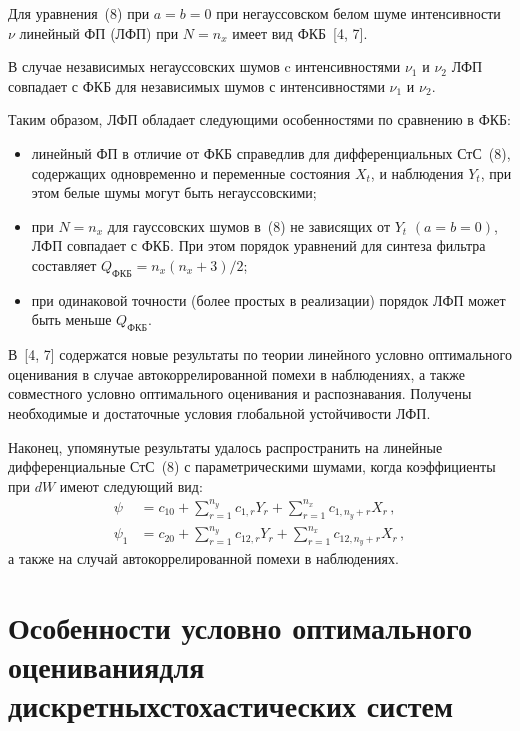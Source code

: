 \begin{multicols}{2}
Для уравнения~(8) при  $a=b=0$ при негауссовском белом шуме
 интенсивности  $\nu$ линейный ФП (ЛФП) при $N=n_x$
 имеет вид ФКБ~[4, 7].

В случае независимых негауссовских шумов c интенсивностями $\nu_1$
и $\nu_2$ ЛФП совпадает с ФКБ для
независимых шумов с интенсивностями $\nu_1$ и $\nu_2$.

Таким образом, ЛФП обладает следующими особенностями по
сравнению в ФКБ:
\begin{itemize}
\item линейный ФП в отличие от ФКБ справедлив для
дифференциальных СтС~(8), содержащих одновременно и переменные
состояния $X_t$, и наблюдения  $Y_t$, при этом белые шумы могут
быть негауссовскими;
\item
при  $N=n_x$ для гауссовских шумов в~(8) не
зависящих от  $Y_t$ $(a=b=0)$, ЛФП совпадает с ФКБ. При этом
порядок уравнений для синтеза фильтра составляет
$Q_{\mbox{ФКБ}} = n_x (n_x + 3)/2$;
\item
при одинаковой точности (более простых в
реализации) порядок ЛФП может быть меньше $Q_{\mbox{ФКБ}}$.
\end{itemize}

В~[4, 7] содержатся новые результаты по теории линейного условно
оптимального оценивания в случае автокоррелированной помехи в
наблюдениях, а также совместного условно оптимального оценивания и
распознавания. Получены необходимые и достаточные условия
глобальной устойчивости ЛФП.

Наконец, упомянутые результаты удалось распространить на линейные
дифференциальные СтС~(8) с параметрическими шумами, когда
коэффициенты при $dW$ имеют следующий вид:
\begin{align*}
    \psi &= c_{10} +\sum\limits_{r=1}^{n_y} c_{1,r} Y_r
    +\sum\limits_{r=1}^{n_x} c_{1, n_y +r} X_r\,,\\
    \psi_1 &= c_{20} +\sum\limits_{r=1}^{n_y} c_{12,r} Y_r
    +\sum\limits_{r=1}^{n_x} c_{12, n_y +r} X_r\,,
\end{align*}
а также на случай автокоррелированной помехи в наблюдениях.

\section{Особенности условно оптимального
 оценивания\newline для дискретных\newline стохастических систем}


\end{multicols}

